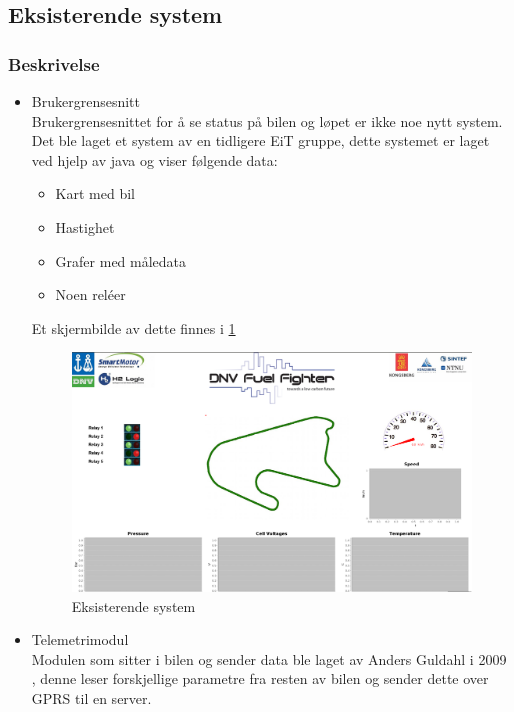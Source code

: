 \subsection{Eksisterende system}
\subsubsection{Beskrivelse}
\begin{itemize}
\item Brukergrensesnitt \\
Brukergrensesnittet for å se status på bilen og løpet er ikke noe nytt system. 
Det ble laget et system av en tidligere EiT gruppe, dette systemet er laget ved hjelp av java og viser følgende data:
\begin{itemize}
\item Kart med bil
\item Hastighet
\item Grafer med måledata
\item Noen reléer
\end{itemize}
Et skjermbilde av dette finnes i \ref{ekssys}
\\
\begin{figure}[H]
\caption{Eksisterende system} 
\label{ekssys}
\includegraphics[width=\textwidth]{images/java.png}
\end{figure}
\item Telemetrimodul \\
Modulen som sitter i bilen og sender data ble laget av Anders Guldahl i 2009 \cite{telemetrithesis}, denne leser forskjellige parametre fra resten av bilen og sender dette over GPRS til en server.
\end{itemize}
